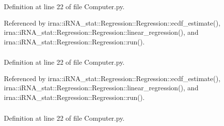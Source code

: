 \-Definition at line 22 of file \-Computer.\-py.



\-Referenced by irna\-::i\-R\-N\-A\-\_\-stat\-::\-Regression\-::\-Regression\-::ecdf\-\_\-estimate(), irna\-::i\-R\-N\-A\-\_\-stat\-::\-Regression\-::\-Regression\-::linear\-\_\-regression(), and irna\-::i\-R\-N\-A\-\_\-stat\-::\-Regression\-::\-Regression\-::run().

\hypertarget{classirna_1_1iRNA__stat_1_1Computer_1_1Computer_ae12ec8a5342a67e83629fb1e9e8a4d6f}{
\subsubsection[{curve\-\_\-param}]{}}
\label{classirna_1_1iRNA__stat_1_1Computer_1_1Computer_ae12ec8a5342a67e83629fb1e9e8a4d6f}


\-Definition at line 22 of file \-Computer.\-py.



\-Referenced by irna\-::i\-R\-N\-A\-\_\-stat\-::\-Regression\-::\-Regression\-::ecdf\-\_\-estimate(), irna\-::i\-R\-N\-A\-\_\-stat\-::\-Regression\-::\-Regression\-::linear\-\_\-regression(), and irna\-::i\-R\-N\-A\-\_\-stat\-::\-Regression\-::\-Regression\-::run().

\hypertarget{classirna_1_1iRNA__stat_1_1Computer_1_1Computer_a4faeb73f7eb7bb093b2bc16c891b9b71}{
\subsubsection[{interact}]{}}
\label{classirna_1_1iRNA__stat_1_1Computer_1_1Computer_a4faeb73f7eb7bb093b2bc16c891b9b71}


\-Definition at line 22 of file \-Computer.\-py.

